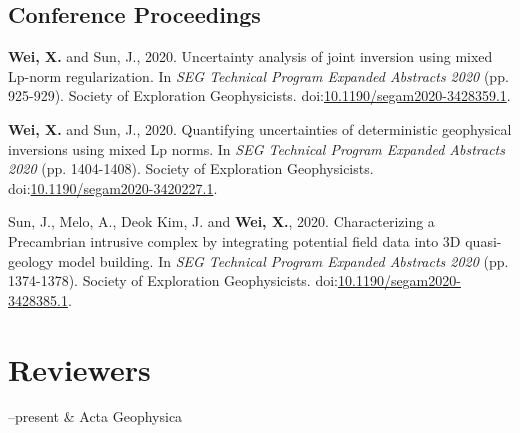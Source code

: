 \documentclass[11pt, a4paper]{article}
\newcommand{\LastName}{Wei}
\newcommand{\Initials}{X}
\newcommand{\Wei}{\textbf{\LastName, \Initials.}}  %
\newcommand{\WeiSun}{\textbf{\LastName, \Initials.} and Sun, J.}  %
\newcommand{\Duration}[2]{\fontsize{10pt}{0}\selectfont #1--#2}
\newcommand{\Future}{future}
\newcommand{\DOI}[1]{doi:\href{https://doi.org/#1}{#1}}
\begin{document}
\subsection*{Conference Proceedings}
\begin{etaremune}
	
	\item 
	\WeiSun, 2020. Uncertainty analysis of joint inversion using mixed Lp-norm regularization. In \emph{SEG Technical Program Expanded Abstracts 2020} (pp. 925-929). Society of Exploration Geophysicists. \DOI{10.1190/segam2020-3428359.1}.

	\item 
	\WeiSun, 2020. Quantifying uncertainties of deterministic geophysical inversions using mixed Lp norms. In \emph{SEG Technical Program Expanded Abstracts 2020} (pp. 1404-1408). Society of Exploration Geophysicists. \DOI{10.1190/segam2020-3420227.1}.
	
	\item 
	Sun, J., Melo, A., Deok Kim, J. and \Wei, 2020. Characterizing a Precambrian intrusive complex by integrating potential field data into 3D quasi-geology model building. In \emph{SEG Technical Program Expanded Abstracts 2020} (pp. 1374-1378). Society of Exploration Geophysicists. \DOI{10.1190/segam2020-3428385.1}.
		
\end{etaremune}


%	
%	

\section*{Reviewers}
\begin{EntriesTable}
	
	\Duration{2021}{present}  &
	Acta Geophysica

\end{EntriesTable}
\end{document}
